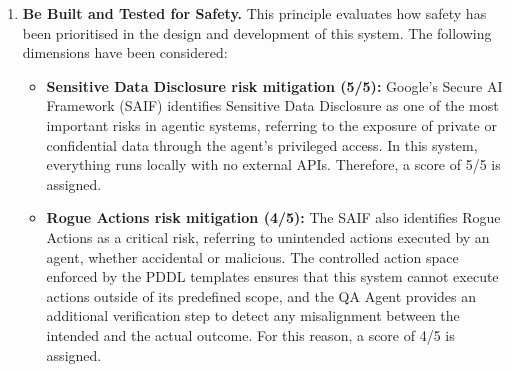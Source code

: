 \begin{enumerate}
\begin{itemize}
        \item \textbf{Independence from user-specific training data (4/5):} This
        system does not rely on any user-specific data during inference, meaning
        that no personal information is used to influence the decisions taken by
        the pipeline. The underlying models were trained on publicly available data,
        and no fine-tuning on user data is performed at any stage. However, there
        might be some hereditary bias from the Qwen models, although is insignificant,
        given this, a score of 4/5 is assigned.

        \item \textbf{Prompt design for bias mitigation (4/5):} All prompts across
        the pipeline follow a consistent structure: they have a maximum of 350
        characters, contain no personal information, and always lead with a clear
        objective followed by a format example, synonyms or descriptive definitions
        of the elements involved. This reduces the likelihood of the model
        interpreting instructions in unintended or biased ways, therefore a score
        of 4/5 is assigned.
    \end{itemize}

    \item \textbf{Be Built and Tested for Safety.} This principle evaluates how
    safety has been prioritised in the design and development of this system. The
    following dimensions have been considered:

    \begin{itemize}
        \item \textbf{Sensitive Data Disclosure risk mitigation (5/5):} Google's
        Secure AI Framework (SAIF) identifies Sensitive Data Disclosure as one of
        the most important risks in agentic systems, referring to the exposure of
        private or confidential data through the agent's privileged access. In this
        system, everything runs locally with no external APIs. Therefore, a score
        of 5/5 is assigned.

        \item \textbf{Rogue Actions risk mitigation (4/5):} The SAIF also identifies
        Rogue Actions as a critical risk, referring to unintended actions executed
        by an agent, whether accidental or malicious. The controlled action space
        enforced by the PDDL templates ensures that this system cannot execute
        actions outside of its predefined scope, and the QA Agent provides an
        additional verification step to detect any misalignment between the intended
        and the actual outcome. For this reason, a score of 4/5 is assigned.


\end{itemize}
\end{enumerate}
